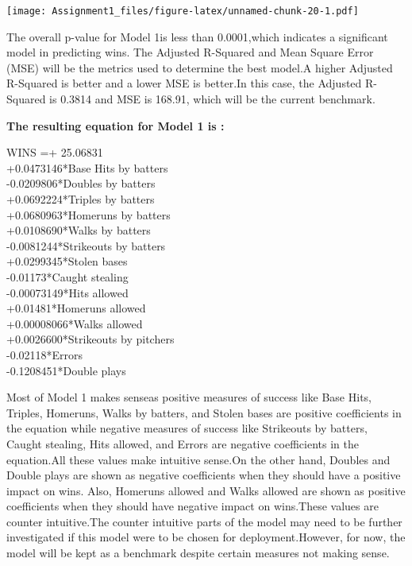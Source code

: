 \documentclass[
]{article}
\begin{document}
\texttt{[image: Assignment1\_files/figure-latex/unnamed-chunk-20-1.pdf]}

The overall p-value for Model 1is less than 0.0001,which indicates a
significant model in predicting wins. The Adjusted R-Squared and Mean
Square Error (MSE) will be the metrics used to determine the best
model.A higher Adjusted R-Squared is better and a lower MSE is better.In
this case, the Adjusted R-Squared is 0.3814 and MSE is 168.91, which
will be the current benchmark.

\textbf{The resulting equation for Model 1 is :}

\begin{center}

WINS =+ 25.06831 \\
      +0.0473146*Base Hits by batters \\
      -0.0209806*Doubles by batters \\
      +0.0692224*Triples by batters \\
      +0.0680963*Homeruns by batters \\
      +0.0108690*Walks by batters \\
      -0.0081244*Strikeouts by batters \\
      +0.0299345*Stolen bases \\
      -0.01173*Caught stealing \\
      -0.00073149*Hits allowed \\
      +0.01481*Homeruns allowed \\
      +0.00008066*Walks allowed \\
      +0.0026600*Strikeouts by pitchers \\
      -0.02118*Errors \\
      -0.1208451*Double plays \\
\end{center}

Most of Model 1 makes senseas positive measures of success like Base
Hits, Triples, Homeruns, Walks by batters, and Stolen bases are positive
coefficients in the equation while negative measures of success like
Strikeouts by batters, Caught stealing, Hits allowed, and Errors are
negative coefficients in the equation.All these values make intuitive
sense.On the other hand, Doubles and Double plays are shown as negative
coefficients when they should have a positive impact on wins. Also,
Homeruns allowed and Walks allowed are shown as positive coefficients
when they should have negative impact on wins.These values are counter
intuitive.The counter intuitive parts of the model may need to be
further investigated if this model were to be chosen for
deployment.However, for now, the model will be kept as a benchmark
despite certain measures not making sense.
\end{document}

